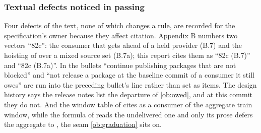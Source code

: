 \subsubsection{Textual defects noticed in passing}

Four defects of the text, none of which changes a rule, are recorded for the
specification's owner because they affect citation. Appendix B numbers two
vectors ``82c'': the consumer that gets ahead of a held provider (B.7) and
the hoisting of  over a mixed source set (B.7a); this
report cites them as ``82c (B.7)'' and ``82c (B.7a)''. In  the
bullets ``continue publishing packages that are not blocked'' and ``not
release a package at the baseline commit of a consumer it still owes'' are
run into the preceding bullet's line rather than set as items. The design
history says the release notes list the departure of \cref{ob:owed}, and at
this commit they do not. And the window table of  cites
 as a consumer of the aggregate train window, while the formula
of  reads the undelivered one and only its prose defers the
aggregate to , the seam \cref{ob:graduation} sits on.
